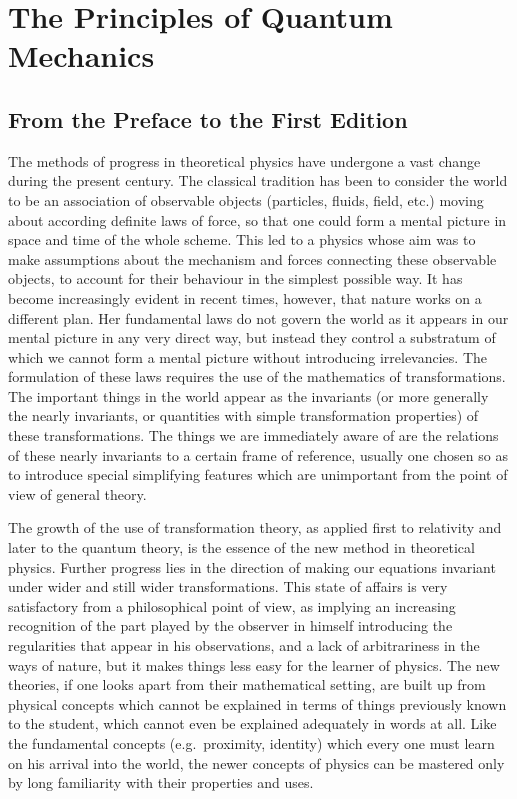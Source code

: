\chapter{The Principles of Quantum Mechanics}



\section*{From the Preface to the First Edition}

The methods of progress in theoretical physics have undergone a vast change during the present century.  The classical tradition has been to consider the world to be an association of observable objects (particles, fluids, field, etc.) moving about according definite laws of force, so that one could form a mental picture in space and time of the whole scheme.  This led to a physics whose aim was to make assumptions about the mechanism and forces connecting these observable objects, to account for their behaviour in the simplest possible way. It has become increasingly evident in recent times, however, that nature works on a different plan. Her fundamental laws do not govern the world as it appears in our mental picture in any very direct way, but instead they control a substratum of which we cannot form a mental picture without introducing irrelevancies.  The formulation of these laws requires the use of the mathematics of transformations.  The important things in the world appear as the invariants (or more generally the nearly invariants, or quantities with simple transformation properties) of these transformations. The things we are immediately aware of are the relations of these nearly invariants to a certain frame of reference, usually one chosen so as to introduce special simplifying features which are unimportant from the point of view of general theory. 

The growth of the use of transformation theory, as applied first to relativity and later to the quantum theory, is the essence of the new method in theoretical physics.  Further progress lies in the direction of making our equations invariant under wider and still wider transformations.  This state of affairs is very satisfactory from a philosophical point of view, as implying an increasing recognition of the part played by the observer in himself introducing the regularities that appear in his observations, and a lack of arbitrariness in the ways of nature, but it makes things less easy for the learner of physics.  The new theories, if one looks apart from their mathematical setting, are built up from physical concepts which cannot be explained in terms of things previously known to the student, which cannot even be explained adequately in words at all.  Like the fundamental concepts (e.g.\ proximity, identity) which every one must learn on his arrival into the world, the newer concepts of physics can be mastered only by long familiarity with their properties and uses.

